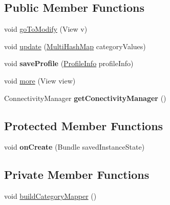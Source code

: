 \subsection*{Public Member Functions}
\begin{DoxyCompactItemize}
\item 
void \hyperlink{classcom_1_1example_1_1sebastian_1_1tindertp_1_1EditProfileActivity_a6077b35bfe948e3086495f3f172fcf3c}{go\+To\+Modify} (View v)
\item 
void \hyperlink{classcom_1_1example_1_1sebastian_1_1tindertp_1_1EditProfileActivity_ac543c096572797f12dde5a0f4f5f96e5}{update} (\hyperlink{classcom_1_1example_1_1sebastian_1_1tindertp_1_1commonTools_1_1MultiHashMap}{Multi\+Hash\+Map} category\+Values)
\item 
void {\bfseries save\+Profile} (\hyperlink{classcom_1_1example_1_1sebastian_1_1tindertp_1_1commonTools_1_1ProfileInfo}{Profile\+Info} profile\+Info)\hypertarget{classcom_1_1example_1_1sebastian_1_1tindertp_1_1EditProfileActivity_a14d45071284e78445bbc85d1cf0da39b}{}\label{classcom_1_1example_1_1sebastian_1_1tindertp_1_1EditProfileActivity_a14d45071284e78445bbc85d1cf0da39b}

\item 
void \hyperlink{classcom_1_1example_1_1sebastian_1_1tindertp_1_1EditProfileActivity_a30996a0a29b6859615999295f93598ce}{more} (View view)
\item 
Connectivity\+Manager {\bfseries get\+Conectivity\+Manager} ()\hypertarget{classcom_1_1example_1_1sebastian_1_1tindertp_1_1EditProfileActivity_a6b36095c341549de2e7ffb80f09a3954}{}\label{classcom_1_1example_1_1sebastian_1_1tindertp_1_1EditProfileActivity_a6b36095c341549de2e7ffb80f09a3954}

\end{DoxyCompactItemize}
\subsection*{Protected Member Functions}
\begin{DoxyCompactItemize}
\item 
void {\bfseries on\+Create} (Bundle saved\+Instance\+State)\hypertarget{classcom_1_1example_1_1sebastian_1_1tindertp_1_1EditProfileActivity_af7417bdbf4882fca0a526679d8fecca1}{}\label{classcom_1_1example_1_1sebastian_1_1tindertp_1_1EditProfileActivity_af7417bdbf4882fca0a526679d8fecca1}

\end{DoxyCompactItemize}
\subsection*{Private Member Functions}
\begin{DoxyCompactItemize}
\item 
void \hyperlink{classcom_1_1example_1_1sebastian_1_1tindertp_1_1EditProfileActivity_a856487af26884b980f8c5409c52cd890}{build\+Category\+Mapper} ()
\end{DoxyCompactItemize}
